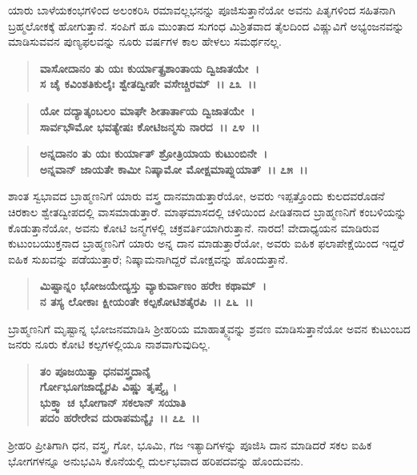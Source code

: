 ಯಾರು ಬಾಳೆಯಕಂಭಗಳಿಂದ ಅಲಂಕರಿಸಿ ರಮಾವಲ್ಲಭನನ್ನು ಪೂಜಿಸುತ್ತಾನೆಯೋ ಅವನು ಪಿತೃಗಳಿಂದ ಸಹಿತನಾಗಿ ಬ್ರಹ್ಮಲೋಕಕ್ಕೆ ಹೋಗುತ್ತಾನೆ. ಸಂಪಿಗೆ ಹೂ ಮುಂತಾದ ಸುಗಂಧ ಮಿಶ್ರಿತವಾದ ತೈಲದಿಂದ ವಿಷ್ಣುವಿಗೆ ಅಭ್ಯಂಜನವನ್ನು ಮಾಡಿಸುವವನ ಪುಣ್ಯಫಲವನ್ನು ನೂರು ವರ್ಷಗಳ ಕಾಲ ಹೇಳಲು ಸಮರ್ಥನಲ್ಲ.

\begin{verse}
\textbf{ವಾಸೋದಾನಂ ತು ಯಃ ಕುರ್ಯಾತ್ಪ್ರಶಾಂತಾಯ ದ್ವಿಜಾತಯೇ~।}\\\textbf{ಸ ಚೈ ಕವಿಂಶತಿಕುಲೈಃ ಶ್ವೇತದ್ವೀಪೇ ವಸೇಚ್ಚಿರಮ್~।। ೭೩~।। }
\end{verse}

\begin{verse}
\textbf{ಯೋ ದದ್ಯಾತ್ಕಂಬಲಂ ಮಾಘೇ ಶೀತಾರ್ತಾಯ ದ್ವಿಜಾತಯೇ~।}\\\textbf{ಸಾರ್ವಭೌಮೋ ಭವತ್ಯೇಷಃ ಕೋಟಿಜನ್ಮಸು ನಾರದ~।। ೭೪~।।} 
\end{verse}

\begin{verse}
\textbf{ಅನ್ನದಾನಂ ತು ಯಃ ಕುರ್ಯಾತ್ ಶ್ರೋತ್ರಿಯಾಯ ಕುಟುಂಬಿನೇ~।}\\\textbf{ಅನ್ನವಾನ್ ಜಾಯತೇ ಕಾಮೀ ನಿಷ್ಕಾಮೋ ಮೋಕ್ಷಮಾಪ್ನುಯಾತ್~।। ೭೫~।।}
\end{verse}

ಶಾಂತ ಸ್ವಭಾವದ ಬ್ರಾಹ್ಮಣನಿಗೆ ಯಾರು ವಸ್ತ್ರ ದಾನಮಾಡುತ್ತಾರೆಯೋ, ಅವರು ಇಪ್ಪತ್ತೊಂದು ಕುಲದವರೊಡನೆ ಚಿರಕಾಲ ಶ್ವೇತದ್ವೀಪದಲ್ಲಿ ವಾಸಮಾಡುತ್ತಾರೆ. ಮಾಘಮಾಸದಲ್ಲಿ ಚಳಿಯಿಂದ ಪೀಡಿತನಾದ ಬ್ರಾಹ್ಮಣನಿಗೆ ಕಂಬಳಿಯನ್ನು ಕೊಡುತ್ತಾನೆಯೋ, ಅವನು ಕೋಟಿ ಜನ್ಮಗಳಲ್ಲಿ ಚಕ್ರವರ್ತಿಯಾಗಿರುತ್ತಾನೆ. ನಾರದ! ವೇದಾಧ್ಯಯನ ಮಾಡಿರುವ ಕುಟುಂಬಯುಕ್ತನಾದ ಬ್ರಾಹ್ಮಣನಿಗೆ ಯಾರು ಅನ್ನ ದಾನ ಮಾಡುತ್ತಾರೆಯೋ, ಅವರು ಐಹಿಕ ಫಲಾಪೇಕ್ಷೆಯಿಂದ ಇದ್ದರೆ ಐಹಿಕ ಸುಖವನ್ನು ಪಡೆಯುತ್ತಾರೆ; ನಿಷ್ಕಾಮನಾಗಿದ್ದರೆ ಮೋಕ್ಷವನ್ನು ಹೊಂದುತ್ತಾನೆ.

\begin{verse}
\textbf{ಮಿಷ್ಟಾನ್ನಂ ಭೋಜಯೇದ್ಯಸ್ತು ವ್ಯಾಕುರ್ವಾಣಂ ಹರೇಃ ಕಥಾಮ್~।}\\\textbf{ನ ತಸ್ಯ ಲೋಕಾಃ ಕ್ಷೀಯಂತೇ ಕಲ್ಪಕೋಟಿಶತೈರಪಿ~।। ೭೬~।।}
\end{verse}

ಬ್ರಾಹ್ಮಣನಿಗೆ ಮೃಷ್ಟಾನ್ನ ಭೋಜನಮಾಡಿಸಿ ಶ‍್ರೀಹರಿಯ ಮಾಹಾತ್ಮ್ಯವನ್ನು ಶ್ರವಣ ಮಾಡಿಸುತ್ತಾನೆಯೋ ಅವನ ಕುಟುಂಬದ ಜನರು ನೂರು ಕೋಟಿ ಕಲ್ಪಗಳಲ್ಲಿಯೂ ನಾಶವಾಗುವುದಿಲ್ಲ.

\begin{verse}
\textbf{ತಂ ಪೂಜಯಿತ್ವಾ ಧನವಸ್ತ್ರದಾನೈ\enginline{-}}\\\textbf{ರ್ಗೋಭೂಗಜಾದ್ಯೈರಪಿ ವಿಷ್ಣು ತೃಪ್ತ್ಯೈ~। }\\\textbf{ಭುಕ್ತ್ವಾ ಚ ಭೋಗಾನ್ ಸಕಲಾನ್ ಸಯಾತಿ} \\\textbf{ಪದಂ ಹರೇರೇವ ದುರಾಪಮನ್ಯೈಃ~।। ೭೭~।।}
\end{verse}

ಶ‍್ರೀಹರಿ ಪ್ರೀತಿಗಾಗಿ ಧನ, ವಸ್ತ್ರ, ಗೋ, ಭೂಮಿ, ಗಜ ಇತ್ಯಾದಿಗಳನ್ನು ಪೂಜಿಸಿ ದಾನ ಮಾಡಿದರೆ ಸಕಲ ಐಹಿಕ ಭೋಗಗಳನ್ನೂ ಅನುಭವಿಸಿ ಕೊನೆಯಲ್ಲಿ ದುರ್ಲಭವಾದ ಹರಿಪದವನ್ನು ಹೊಂದುವನು.

